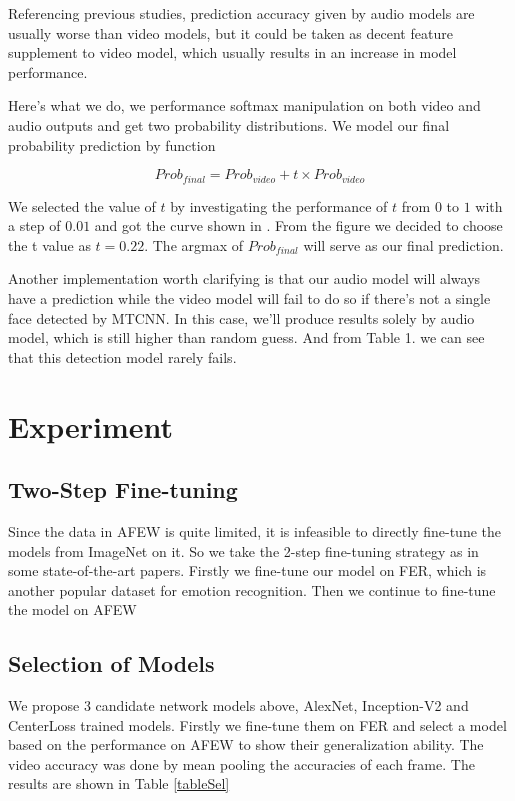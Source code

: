 \documentclass[10pt,twocolumn,letterpaper]{article}
\begin{document}
Referencing previous studies, prediction accuracy given by audio models are usually worse than video models, but it could be taken as decent feature supplement to video model, which usually results in an increase in model performance.

Here's what we do, we performance softmax manipulation on both video and audio outputs and get two probability distributions. We model our final probability prediction by function

\begin{equation}
Prob_{final} = Prob_{video} + t \times Prob_{video} 
\end{equation}

We selected the value of $t$ by investigating the performance of $t$ from $0$ to $1$ with a step of $0.01$ and got the curve shown in . From the figure we decided to choose the t value as $t=0.22$. The argmax of $Prob_{final}$ will serve as our final prediction.

Another implementation worth clarifying is that our audio model will always have a prediction while the video model will fail to do so if there's not a single face detected by MTCNN. In this case, we'll produce results solely by audio model, which is still higher than random guess. And from Table 1. we can see that this detection model rarely fails. 

\section{Experiment}

\subsection{Two-Step Fine-tuning}

Since the data in AFEW is quite limited, it is infeasible to directly fine-tune the models from ImageNet on it. So we take the 2-step fine-tuning strategy as in some state-of-the-art papers. Firstly we fine-tune our model on FER, which is another popular dataset for emotion recognition. Then we continue to fine-tune the model on AFEW

\subsection{Selection of Models}

We propose 3 candidate network models above, AlexNet, Inception-V2 and CenterLoss trained models. Firstly we fine-tune them on FER and select a model based on the performance on AFEW to show their generalization ability. The video accuracy was done by mean pooling the accuracies of each frame. The results are shown in Table \ref{tableSel}
\end{document}
